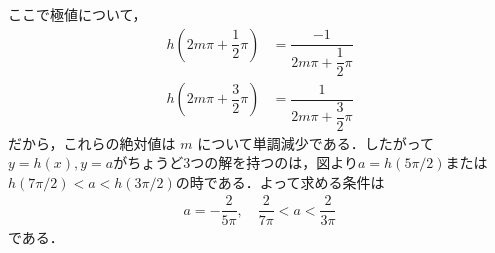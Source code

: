 \documentclass[../../main.tex]{subfiles}
\begin{document}
ここで極値について，
\begin{align}
  h\left( 2m\pi + \dfrac{1}{2}\pi \right) &= \dfrac{-1}{2m\pi + \dfrac{1}{2}\pi} \\
  h\left( 2m\pi + \dfrac{3}{2}\pi \right) &= \dfrac{1}{2m\pi + \dfrac{3}{2}\pi}
\end{align}
だから，これらの絶対値は $m$ について単調減少である．したがって$y=h(x), y=a$がちょうど$3$つの解を持つのは，図より$a=h(5\pi/2)$または$h(7\pi/2)<a<h(3\pi/2)$の時である．よって求める条件は
\begin{align}
  a = -\dfrac{2}{5\pi}, \quad \dfrac{2}{7\pi} < a < \dfrac{2}{3\pi}
\end{align}
である．
\end{document}
